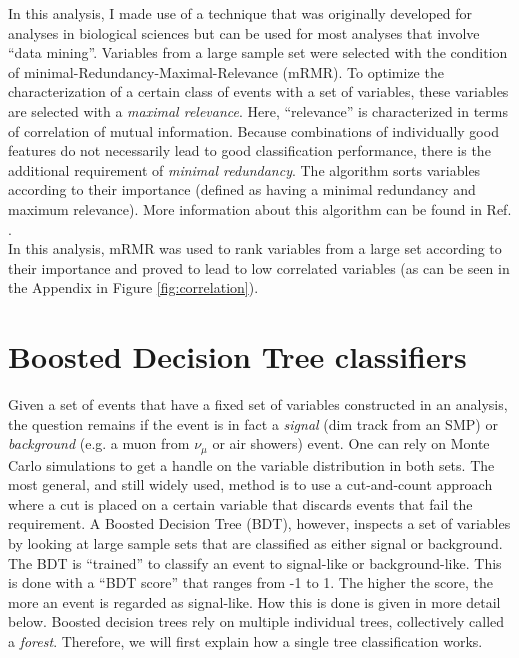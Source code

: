 In this analysis, I made use of a technique that was originally developed for analyses in biological sciences but can be used for most analyses that involve ``data mining''. Variables from a large sample set were selected with the condition of minimal-Redundancy-Maximal-Relevance (mRMR). To optimize the characterization of a certain class of events with a set of variables, these variables are selected with a \textit{maximal relevance}. Here, ``relevance'' is characterized in terms of correlation of mutual information. Because combinations of individually good features do not necessarily lead to good classification performance, there is the additional requirement of \textit{minimal redundancy}. The algorithm sorts variables according to their importance (defined as having a minimal redundancy and maximum relevance). More information about this algorithm can be found in Ref. \cite{1453511}.\\

\noindent In this analysis, mRMR was used to rank variables from a large set according to their importance and proved to lead to low correlated variables (as can be seen in the Appendix in Figure \ref{fig:correlation}).




\section{Boosted Decision Tree classifiers}
\label{sec:BDT}
Given a set of events that have a fixed set of variables constructed in an analysis, the question remains if the event is in fact a \textit{signal} (dim track from an SMP) or \textit{background} (e.g. a muon from $\nu_\mu$ or air showers) event. One can rely on Monte Carlo simulations to get a handle on the variable distribution in both sets. The most general, and still widely used, method is to use a cut-and-count approach where a cut is placed on a certain variable that discards events that fail the requirement. A Boosted Decision Tree (BDT), however, inspects a set of variables by looking at large sample sets that are classified as either signal or background. The BDT is ``trained'' to classify an event to signal-like or background-like. This is done with a ``BDT score'' that ranges from -1 to 1. The higher the score, the more an event is regarded as signal-like. How this is done is given in more detail below. Boosted decision trees rely on multiple individual trees, collectively called a \textit{forest}. Therefore, we will first explain how a single tree classification works.


